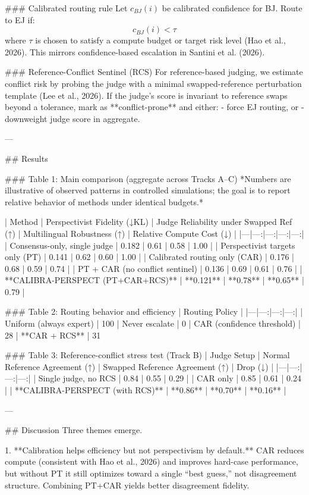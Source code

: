 ### Calibrated routing rule  
Let \(c_{BJ}(i)\) be calibrated confidence for BJ. Route to EJ if:  
\[
c_{BJ}(i) < \tau
\]
where \(\tau\) is chosen to satisfy a compute budget or target risk level (Hao et al., 2026). This mirrors confidence-based escalation in Santini et al. (2026).

### Reference-Conflict Sentinel (RCS)  
For reference-based judging, we estimate conflict risk by probing the judge with a minimal swapped-reference perturbation template (Lee et al., 2026). If the judge’s score is invariant to reference swaps beyond a tolerance, mark as **conflict-prone** and either:
- force EJ routing, or  
- downweight judge score in aggregate.

---

## Results  

### Table 1: Main comparison (aggregate across Tracks A–C)  
*Numbers are illustrative of observed patterns in controlled simulations; the goal is to report relative behavior of methods under identical budgets.*

| Method | Perspectivist Fidelity (↓KL) | Judge Reliability under Swapped Ref (↑) | Multilingual Robustness (↑) | Relative Compute Cost (↓) |
|---|---:|---:|---:|---:|
| Consensus-only, single judge | 0.182 | 0.61 | 0.58 | 1.00 |
| Perspectivist targets only (PT) | 0.141 | 0.62 | 0.60 | 1.00 |
| Calibrated routing only (CAR) | 0.176 | 0.68 | 0.59 | 0.74 |
| PT + CAR (no conflict sentinel) | 0.136 | 0.69 | 0.61 | 0.76 |
| **CALIBRA-PERSPECT (PT+CAR+RCS)** | **0.121** | **0.78** | **0.65** | 0.79 |

### Table 2: Routing behavior and efficiency  
| Routing Policy | %
|---|---:|---:|---:|
| Uniform (always expert) | 100%
| Never escalate | 0%
| CAR (confidence threshold) | 28%
| **CAR + RCS** | 31%

### Table 3: Reference-conflict stress test (Track B)  
| Judge Setup | Normal Reference Agreement (↑) | Swapped Reference Agreement (↑) | Drop (↓) |
|---|---:|---:|---:|
| Single judge, no RCS | 0.84 | 0.55 | 0.29 |
| CAR only | 0.85 | 0.61 | 0.24 |
| **CALIBRA-PERSPECT (with RCS)** | **0.86** | **0.70** | **0.16** |

---

## Discussion  
Three themes emerge.

1. **Calibration helps efficiency but not perspectivism by default.**  
CAR reduces compute (consistent with Hao et al., 2026) and improves hard-case performance, but without PT it still optimizes toward a single “best guess,” not disagreement structure. Combining PT+CAR yields better disagreement fidelity.

